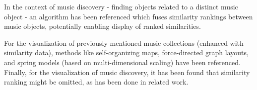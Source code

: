 In the context of music discovery - finding objects related to a distinct music object - an algorithm has been referenced which fuses similarity rankings between music objects, potentially enabling display of ranked similarities.

For the visualization of previously mentioned music collections (enhanced with similarity data), methods like self-organizing maps, force-directed graph layouts, and spring models (based on multi-dimensional scaling) have been referenced. Finally, for the visualization of music discovery, it has been found that similarity ranking might be omitted, as has been done in related work.